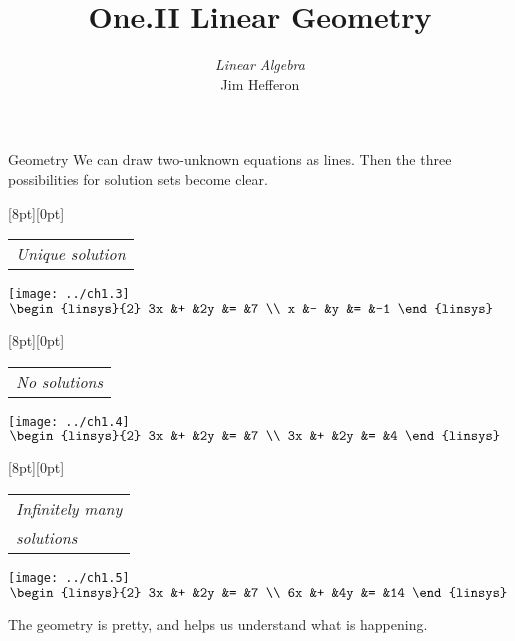 \documentclass[10pt,t]{beamer}
\title[Linear Geometry] %
{One.II Linear Geometry}
\author{\textit{Linear Algebra} \\ {\small Jim Hef{}feron}}
\institute{
  \texttt{http://joshua.smcvt.edu/linearalgebra}
}
\date{}
\begin{document}
\begin{frame}
  \titlepage
\end{frame}

\begin{frame}{Geometry} 
We can draw two-unknown equations as lines.
Then the three possibilities for solution sets become clear.
\pause
\begin{center} %
  \begin{minipage}[b]{1.35in}
    \raisebox{-2pt}[8pt][0pt]{\small \begin{tabular}{@{}l}
      \small \textit{Unique solution}
    \end{tabular}}
    \begin{center}
      \texttt{[image: ../ch1.3]} \\[.75ex]
      \small $\begin{linsys}{2}
                         3x  &+  &2y  &=  &7   \\
                         x   &-  &y   &=  &-1
                       \end{linsys}$
    \end{center}
  \end{minipage}
  \hspace*{0em}
  \begin{minipage}[b]{1.35in}
    \raisebox{-2pt}[8pt][0pt]{\small \begin{tabular}{@{}l}
      \small \textit{No solutions}
    \end{tabular}}
    \begin{center}
      \texttt{[image: ../ch1.4]} \\[.75ex]
      \small $\begin{linsys}{2}
                         3x  &+  &2y  &=  &7   \\
                         3x  &+  &2y  &=  &4
                       \end{linsys}$
    \end{center}
  \end{minipage}
  \hspace*{0em}
  \begin{minipage}[b]{1.35in}
    \raisebox{-2pt}[8pt][0pt]{\small \begin{tabular}[t]{@{}l}
      \textit{Infinitely many} \\
      \textit{solutions}
    \end{tabular}}
    \begin{center}
      \texttt{[image: ../ch1.5]}         \\[.75ex]
      \small $ \begin{linsys}{2}
                         3x  &+  &2y  &=  &7   \\
                         6x  &+  &4y  &=  &14
                       \end{linsys}$
    \end{center}
  \end{minipage}
\end{center}
The geometry is pretty, and helps us understand what is happening.
\end{frame}
\end{document}
